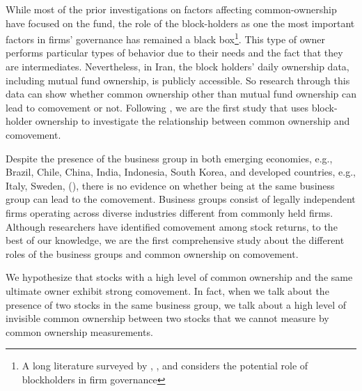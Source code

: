 	While most of the prior investigations on factors affecting common-ownership have focused on the fund, the role of the block-holders as one the most important factors in firms' governance has remained a black box\footnote{A long literature surveyed by \cite{holderness2003survey}, \cite{edmans2014blockholders}, and \cite{edmans2017blockholders} considers the potential role of blockholders in firm governance}. This type of owner performs particular types of behavior due to their needs and the fact that they are intermediates. Nevertheless, in Iran, the block holders' daily ownership data, including mutual fund ownership, is publicly accessible. So research through this data can show whether common ownership other than mutual fund ownership can lead to comovement or not. Following \cite{AntonPolk}, we are the first study that uses block-holder ownership to investigate the relationship between common ownership and comovement.
		
Despite the presence of the business group in both emerging economies, e.g., Brazil, Chile, China, India, Indonesia, South Korea, and developed countries, e.g., Italy, Sweden, (\cite{khanna2007business}), there is no evidence on whether being at the same business group can lead to the comovement. Business groups consist of legally independent firms operating across diverse industries different from commonly held firms. Although researchers have identified comovement among stock
returns,  to the best of our knowledge, we are the first comprehensive study about the different roles of the business groups and common ownership on comovement. 




%	
%	


We hypothesize that stocks with a high level of common ownership and the same ultimate owner exhibit strong comovement. In fact, when we talk about the presence of two stocks in the same business group, we talk about a high level of invisible common ownership between two stocks that we cannot measure by common ownership measurements. 

